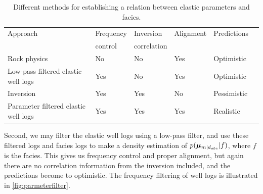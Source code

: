 \begin{table}
\centering
\caption{Different methods for establishing a relation between elastic parameters and facies.}
\label{tab:paramsfacies}
\begin{tabular}{|l|l|l|l|l|l|}
\hline
Approach & Frequency & Inversion   & Alignment & Predictions\\
         & control   & correlation &  & \\ \hline
Rock physics                               &  No &  No & Yes & Optimistic  \\ \hline
Low-pass filtered elastic well logs        & Yes &  No & Yes & Optimistic  \\ \hline
Inversion                                  & Yes & Yes & No  & Pessimistic \\ \hline
Parameter filtered elastic well logs & Yes & Yes & Yes & Realistic   \\ \hline
\end{tabular}
\end{table}

Second, we may filter the elastic well logs using a low-pass filter,
and use these filtered logs and facies logs to make a density
estimation of $p(\bm\mu_{m|d_{obs}}|f)$, where $f$ is the facies. This
gives us frequency control and proper alignment, but again there are
no correlation information from the inversion included, and the
predictions become to optimistic. The frequency filtering of well logs
is illustrated in \autoref{fig:parmeterfilter}.

